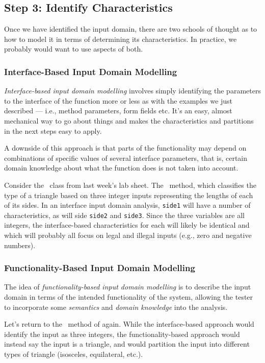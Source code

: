 \subsection*{Step 3: Identify Characteristics}

Once we have identified the input domain, there are two schools of thought as to
how to model it in terms of determining its characteristics. In practice, we
probably would want to use aspects of both.  

\subsubsection*{Interface-Based Input Domain Modelling}

{\it Interface-based input domain modelling} involves simply identifying the
parameters to the interface of the function more or less as with the examples we
just described --- i.e., method parameters, form fields etc. It's an easy,
almost mechanical way to go about things and makes the characteristics and
partitions in the next steps easy to apply. 

A downside of this approach is that parts of the functionality may depend
on combinations of specific values of several interface parameters, that is,
certain domain knowledge about what the function does is not taken into account.

Consider the \triangleclass~class from last week's lab sheet. The
\classifymethod~method, which classifies the type of a triangle based on three
integer inputs representing the lengths of each of its sides. In an interface
input domain analysis, {\tt side1} will have a number of characteristics, as
will side {\tt side2} and {\tt side3}. Since the three variables are all
integers, the interface-based characteristics for each will likely be identical
and which will probably all focus on legal and illegal inputs (e.g., zero and
negative numbers).

\subsubsection*{Functionality-Based Input Domain Modelling}

The idea of {\it functionality-based input domain modelling} is to describe the
input domain in terms of the intended functionality of the system, allowing the
tester to incorporate some {\it semantics} and {\it domain knowledge} into the
analysis. 

Let's return to the \classifymethod~method of \triangleclass again. While the
interface-based approach would identify the input as three integers, the
functionality-based approach would instead say the input is a triangle, and
would partition the input into different types of triangle (isosceles,
equilateral, etc.). 

